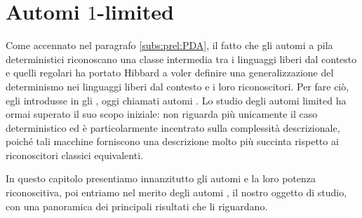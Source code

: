 \chapter{Automi \texorpdfstring{$1$}{1}-limited}
Come accennato nel paragrafo \ref{subs:prel:PDA}, il fatto che gli automi a pila deterministici riconoscano una classe intermedia tra i linguaggi liberi dal contesto e quelli regolari ha portato Hibbard a voler definire una generalizzazione del determinismo nei linguaggi liberi dal contesto e i loro riconoscitori. Per fare ciò, egli introdusse in \cite{Hibbard:67:CFdet} gli , oggi chiamati automi . Lo studio degli automi limited ha ormai superato il suo scopo iniziale: non riguarda più unicamente il caso deterministico ed è particolarmente incentrato sulla complessità descrizionale, poiché tali macchine forniscono una descrizione molto più succinta rispetto ai riconoscitori classici equivalenti.

In questo capitolo presentiamo innanzitutto gli automi  e la loro potenza riconoscitiva, poi entriamo nel merito degli automi , il nostro oggetto di studio, con una panoramica dei principali risultati che li riguardano.



